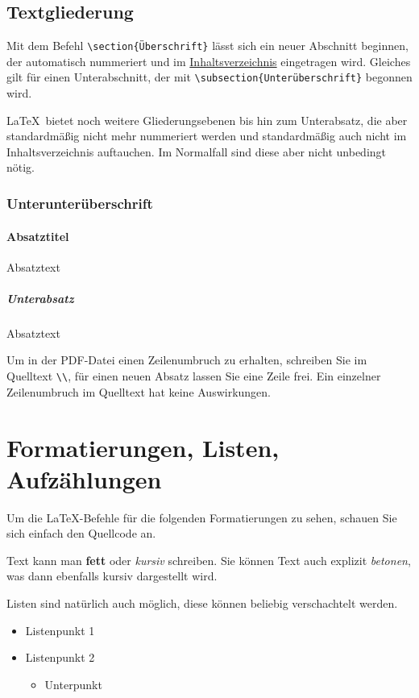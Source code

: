 \subsection{Textgliederung}
Mit dem Befehl \verb|\section{Überschrift}| lässt sich ein neuer Abschnitt beginnen, der automatisch nummeriert und im \hyperref[toc]{Inhaltsverzeichnis} eingetragen wird.
Gleiches gilt für einen Unterabschnitt, der mit \verb|\subsection{Unterüberschrift}| begonnen wird.

\LaTeX\ bietet noch weitere Gliederungsebenen bis hin zum Unterabsatz, die aber standardmäßig nicht mehr nummeriert werden und standardmäßig auch nicht im Inhaltsverzeichnis auftauchen. Im Normalfall sind diese aber nicht unbedingt nötig.
\subsubsection{Unterunterüberschrift}
\paragraph{Absatztitel} Absatztext
\subparagraph{Unterabsatz} Absatztext

Um in der PDF-Datei einen Zeilenumbruch zu erhalten, schreiben Sie im Quelltext \verb|\\|, für einen neuen Absatz lassen Sie eine Zeile frei. Ein einzelner Zeilenumbruch im Quelltext hat keine Auswirkungen.

\section{Formatierungen, Listen, Aufzählungen}
Um die \LaTeX-Befehle für die folgenden Formatierungen zu sehen, schauen Sie sich einfach den Quellcode an.

Text kann man \textbf{fett} oder \textit{kursiv} schreiben. Sie können Text auch explizit \emph{betonen}, was dann ebenfalls kursiv dargestellt wird.

Listen sind natürlich auch möglich, diese können beliebig verschachtelt werden.
\begin{itemize}
\item Listenpunkt 1
\item Listenpunkt 2
\begin{itemize}
\item Unterpunkt
\end{itemize}
\end{itemize}

